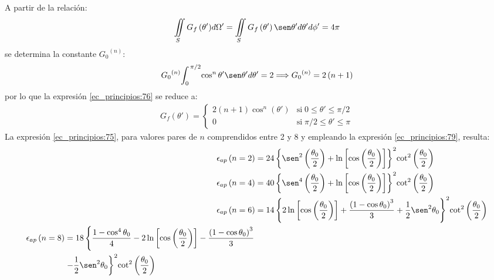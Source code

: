 A partir de la relación:
\begin{align}
\iint\limits_{S}G_f\left(\theta '\right)\!d\Omega ' = \iint\limits_{S}G_f\left(\theta '\right)\sen\theta 'd\theta 'd\phi ' = 4\pi
\label{ec_principios:77}
\end{align}
se determina la constante ${G_0}^{\left(n\right)}$:
\begin{align}
{G_0}^{\left(n\right)}\!\int_0^{\,\pi /2}\!\cos^n\theta '\sen\theta 'd\theta ' = 2 \Longrightarrow {G_0}^{\left(n\right)} = 2\left(n + 1\right)
\label{ec_principios:78}
\end{align}
por lo que la expresión \eqref{ec_principios:76} se reduce a:
\begin{align}
G_f\left(\theta '\right) = 
\begin{cases} 
2\left(n + 1\right)\cos^n\left(\theta '\right)  &\mbox{si}\;0\leq\theta '\leq\pi/2\\
0  &\text{si}\;\pi/2\leq\theta '\leq\pi
\end{cases}
\label{ec_principios:79}
\end{align}
La expresión \eqref{ec_principios:75}, para valores pares de $n$ comprendidos entre 2 y 8 y empleando la expresión \eqref{ec_principios:79}, resulta:
\begin{subequations}
\label{grup_ec_principios:14}
\begin{align}
\epsilon_{ap}\left(n = 2\right) &= 24\left\{\sen^2\left(\frac{\theta_0}{2}\right) + \ln\left[\cos\left(\frac{\theta_0}{2}\right)\right]\right\}^2\!\cot^2\left(\frac{\theta_0}{2}\right)
\label{ec_principios:80}\\
\epsilon_{ap}\left(n = 4\right) &= 40\left\{\sen^4\left(\frac{\theta_0}{2}\right) + \ln\left[\cos\left(\frac{\theta_0}{2}\right)\right]\right\}^2\!\cot^2\left(\frac{\theta_0}{2}\right)
\label{ec_principios:81}\\
\epsilon_{ap}\left(n = 6\right) &= 14\left\{2\ln\left[\cos\left(\frac{\theta_0}{2}\right)\right] + \frac{\left(1 - \cos\theta_0\right)^3}{3} + \frac{1}{2}\sen^2\theta_0\right\}^2\!\cot^2\left(\frac{\theta_0}{2}\right)
\label{ec_principios:82}\\
\begin{split}
\epsilon_{ap}\left(n = 8\right) &= 18\left\{\frac{1 - \cos^4\theta_0}{4} - 2\ln\left[\cos\left(\frac{\theta_0}{2}\right)\right] - \frac{\left(1 - \cos\theta_0\right)^3}{3}\right.\\
&\left.- \frac{1}{2}\sen^2\theta_0\right\}^2\!\cot^2\left(\frac{\theta_0}{2}\right)
\end{split}
\label{ec_principios:83}
\end{align}
\end{subequations}
